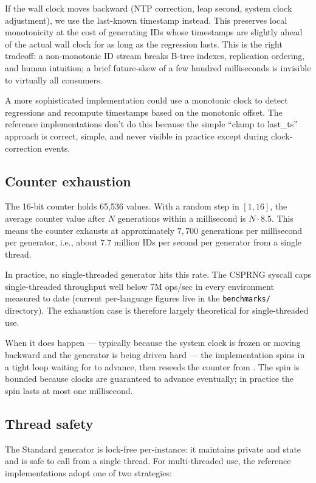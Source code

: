 If the wall clock moves backward (NTP \citep{rfc5905} correction, leap second, system clock adjustment), we use the last-known timestamp instead. This preserves local monotonicity at the cost of generating IDs whose timestamps are slightly ahead of the actual wall clock for as long as the regression lasts. This is the right tradeoff: a non-monotonic ID stream breaks B-tree indexes, replication ordering, and human intuition; a brief future-skew of a few hundred milliseconds is invisible to virtually all consumers.

A more sophisticated implementation could use a monotonic clock to detect regressions and recompute timestamps based on the monotonic offset. The reference implementations don't do this because the simple ``clamp to last\_ts'' approach is correct, simple, and never visible in practice except during clock-correction events.

\subsection{Counter exhaustion}

The 16-bit counter holds 65{,}536 values. With a random step in $[1, 16]$, the average counter value after $N$ generations within a millisecond is $N \cdot 8.5$. This means the counter exhausts at approximately $7{,}700$ generations per millisecond per generator, i.e., about $7.7$ million IDs per second per generator from a single thread.

In practice, no single-threaded generator hits this rate. The CSPRNG syscall caps single-threaded throughput well below 7M ops/sec in every environment measured to date (current per-language figures live in the \texttt{benchmarks/} directory). The exhaustion case is therefore largely theoretical for single-threaded use.

When it does happen --- typically because the system clock is frozen or moving backward and the generator is being driven hard --- the implementation spins in a tight loop waiting for  to advance, then reseeds the counter from . The spin is bounded because clocks are guaranteed to advance eventually; in practice the spin lasts at most one millisecond.

\subsection{Thread safety}

The Standard generator is lock-free per-instance: it maintains private  and  state and is safe to call from a single thread. For multi-threaded use, the reference implementations adopt one of two strategies:

